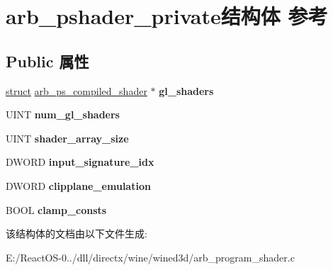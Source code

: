 \hypertarget{structarb__pshader__private}{}\section{arb\+\_\+pshader\+\_\+private结构体 参考}
\label{structarb__pshader__private}
\subsection*{Public 属性}
\begin{DoxyCompactItemize}
\item 
\mbox{\label{structarb__pshader__private_a2c5381e6d760b70c49834660414153f7}} 
\hyperlink{interfacestruct}{struct} \hyperlink{structarb__ps__compiled__shader}{arb\+\_\+ps\+\_\+compiled\+\_\+shader} $\ast$ {\bfseries gl\+\_\+shaders}
\item 
\mbox{\label{structarb__pshader__private_a60f9099b30d0cc12915f02650fc69667}} 
U\+I\+NT {\bfseries num\+\_\+gl\+\_\+shaders}
\item 
\mbox{\label{structarb__pshader__private_adbde953cc283bea93661506d6e66f36d}} 
U\+I\+NT {\bfseries shader\+\_\+array\+\_\+size}
\item 
\mbox{\label{structarb__pshader__private_a79b6b48f6d54e13136fd83f9b993efd5}} 
D\+W\+O\+RD {\bfseries input\+\_\+signature\+\_\+idx}
\item 
\mbox{\label{structarb__pshader__private_a28de73f7d6026fd00068d2f55ababef0}} 
D\+W\+O\+RD {\bfseries clipplane\+\_\+emulation}
\item 
\mbox{\label{structarb__pshader__private_a9eb88df0331fa68a15165cf5c7e4c53a}} 
B\+O\+OL {\bfseries clamp\+\_\+consts}
\end{DoxyCompactItemize}


该结构体的文档由以下文件生成\+:\begin{DoxyCompactItemize}
\item 
E\+:/\+React\+O\+S-\/0../dll/directx/wine/wined3d/arb\+\_\+program\+\_\+shader.\+c\end{DoxyCompactItemize}
